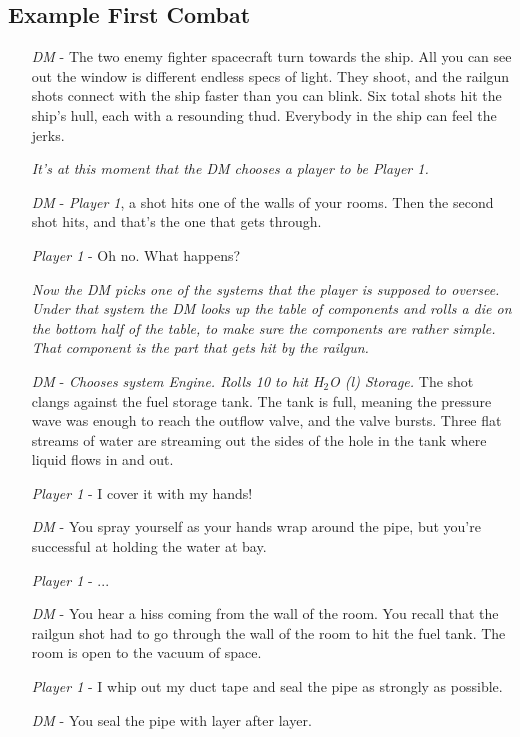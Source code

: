 \documentclass[a4paper]{article}
\begin{document}
\subsection{Example First Combat} \label{example_first_combat}

\begin{enumerate}[leftmargin=2cm]
\item [\textit{DM}] - The two enemy fighter spacecraft turn towards the ship. All you can see out the window is different endless specs of light. They shoot, and the railgun shots connect with the ship faster than you can blink. Six total shots hit the ship's hull, each with a resounding thud. Everybody in the ship can feel the jerks. 
\item [] \textit{It's at this moment that the DM chooses a player to be Player 1.} 
\item [\textit{DM}] - \textit{Player 1}, a shot  hits one of the walls of your rooms. Then the second shot hits, and that's the one that gets through.
\item [\textit{Player 1}] - Oh no. What happens?
\item [] \textit{Now the DM picks one of the systems that the player is supposed to oversee. Under that system the DM looks up the table of components and rolls a die on the bottom half of the table, to make sure the components are rather simple. That component is the part that gets hit by the railgun.}
\item [\textit{DM}] - \textit{Chooses system Engine. Rolls 10 to hit H$_2$O (l) Storage.} The shot clangs against the fuel storage tank. The tank is full, meaning the pressure wave was enough to reach the outflow valve, and the valve bursts. Three flat streams of water are streaming out the sides of the hole in the tank where liquid flows in and out.
\item [\textit{Player 1}] - I cover it with my hands! 
\item [\textit{DM}] - You spray yourself as your hands wrap around the pipe, but you're successful at holding the water at bay.
\item [\textit{Player 1}] - ...
\item [\textit{DM}] - You hear a hiss coming from the wall of the room. You recall that the railgun shot had to go through the wall of the room to hit the fuel tank. The room is open to the vacuum of space.
\item [\textit{Player 1}] - I whip out my duct tape and seal the pipe as strongly as possible.
\item [\textit{DM}] - You seal the pipe with layer after layer.

\end{enumerate}
\end{document}
